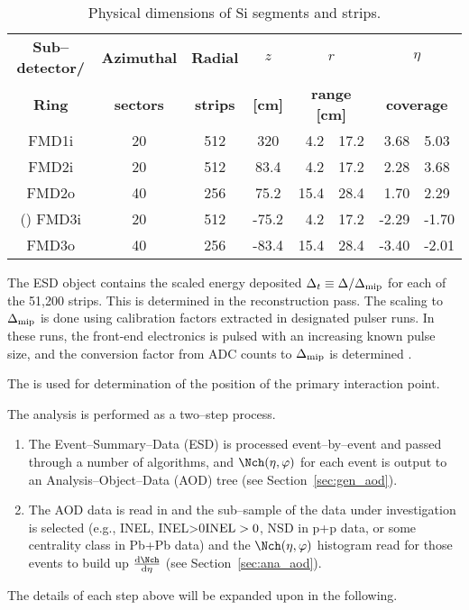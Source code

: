 \documentclass[compat,11pt]{alicenote}
\DeclareRobustCommand{\AlwaysText}[1]{\ifmmode\relax\text{#1}\else #1\fi}
\newcommand*\INEL{\AlwaysText{INEL}}
\newcommand*\NSD{\AlwaysText{NSD}}
\newcommand*\INELGT{\ifmmode\INEL>0\else$\INEL>0$\fi}
\let\INELONE\INELGT
\newcommand*{\etaphi}{\ensuremath(\eta,\varphi)}
\newcommand*\ESD{\AlwaysText{ESD}}
\newcommand{\AOD}{\AlwaysText{AOD}}
\newcommand{\secref}[1]{Section~\ref{#1}}
\newcommand{\DeltaMip}{\ensuremath\Delta_{\text{mip}}}
\newcommand{\dndetadphi}[1][]{{\ensuremath%
    \ifx|#1|\else\left.\fi%
      \Nch\etaphi%
      \ifx|#1|\else\right|_{#1}\fi}}
\newcommand\headColor{\rowcolor{alicered!25!white}}
\newcommand\altRowColor{\rowcolor{aliceyellow!25!white}}
\begin{document}
\begin{table}[htbp]
  \begin{center}
    \caption{Physical dimensions of Si segments and strips.}
    \label{tab:fmd:overview}
    \begin{tabular}{|c|cc|cr@{\space--\space}l|r@{\space--\space}l|}
      \hline
      \headColor%
      \textbf{Sub--detector/} &
      \textbf{Azimuthal}&
      \textbf{Radial} &
      $z$ &
      \multicolumn{2}{c|}{\textbf{$r$}} &
      \multicolumn{2}{c|}{\textbf{$\eta$}} \\ 
      \rowcolor{alicered!25!white}
      \textbf{Ring}&  
      \textbf{sectors} &
      \textbf{strips} & 
      \textbf{[cm]} &
      \multicolumn{2}{c|}{\textbf{range [cm]}} &
      \multicolumn{2}{c|}{\textbf{coverage}} \\
      \hline
      FMD1i & 20& 512& 320  &  4.2& 17.2& 3.68&  5.03\\
      \altRowColor{}%
      FMD2i & 20& 512&  83.4&  4.2& 17.2& 2.28&  3.68\\
      FMD2o & 40& 256&  75.2& 15.4& 28.4& 1.70&  2.29\\
      \altRowColor()%
      FMD3i & 20& 512& -75.2&  4.2& 17.2&-2.29& -1.70\\
      FMD3o & 40& 256& -83.4& 15.4& 28.4&-3.40& -2.01\\
      \hline
    \end{tabular}
  \end{center}
\end{table}

The \FMD{} \ESD{} object contains the scaled energy deposited
$\Delta_t\equiv\Delta /\DeltaMip$ for each of the 51,200 strips.
This is determined in the reconstruction pass.  The scaling to
$\DeltaMip$ is done using calibration factors extracted in
designated pulser runs.  In these runs, the front-end electronics is
pulsed with an increasing known pulse size, and the conversion factor
from ADC counts to $\DeltaMip$ is determined \cite{cholm:2009}.

The \SPD{} is used for determination of the position of the primary
interaction point.

The analysis is performed as a two--step process.  
\begin{enumerate}
\item The Event--Summary--Data (\ESD{}) is processed event--by--event
  and passed through a number of algorithms, and
  $\dndetadphi$ for each event is output to an Analysis--Object--Data
  (\AOD{}) tree (see \secref{sec:gen_aod}).
\item The \AOD{} data is read in and the sub--sample of the data under
  investigation is selected (e.g., \INEL{}, \INELONE{}, \NSD{} in p+p data, or
  some centrality class in Pb+Pb data) and the $\dndetadphi$ histogram read for
  those events to build up $\dndeta$ (see \secref{sec:ana_aod}).
\end{enumerate}
The details of each step above will be expanded upon in the
following. 
\end{document}
